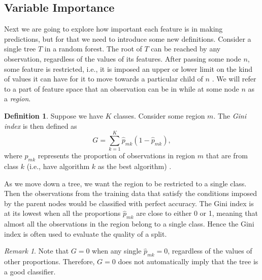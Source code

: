 \documentclass{l4proj}
\theoremstyle{definition}
\newtheorem{definition}{Definition}[chapter]
\theoremstyle{remark}
\newtheorem{remark}{Remark}[chapter]
\begin{document}
\subsection{Variable Importance}

Next we are going to explore how important each feature is in making
predictions, but for that we need to introduce some new definitions. Consider a
single tree $T$ in a random forest. The root of $T$ can be reached by any
observation, regardless of the values of its features. After passing some node
$n$, some feature is restricted, i.e., it is imposed an upper or lower limit on
the kind of values it can have for it to move towards a particular child of $n$
\cite{James:2014:ISL:2517747}. We will refer to a part of feature space that an
observation can be in while at some node $n$ as a \emph{region}.

\begin{definition}
  Suppose we have $K$ classes. Consider some region $m$. The \emph{Gini index}
  is then defined as
  \[ G = \sum_{k=1}^K \hat{p}_{mk}(1-\hat{p}_{mk}), \]
  where $\hat{p}_{mk}$ represents the proportion of observations in region $m$
  that are from class $k$ (i.e., have algorithm $k$ as the best algorithm)
  \cite{James:2014:ISL:2517747}.
\end{definition}

As we move down a tree, we want the region to be restricted to a single class.
Then the observations from the training data that satisfy the conditions imposed
by the parent nodes would be classified with perfect accuracy. The Gini index is
at its lowest when all the proportions $\hat{p}_{mk}$ are close to either 0 or
1, meaning that almost all the observations in the region belong to a single
class. Hence the Gini index is often used to evaluate the quality of a split.

\begin{remark}
  Note that $G=0$ when any single $\hat{p}_{mk}=0$, regardless of the values of
  other proportions. Therefore, $G=0$ does not automatically imply that the tree
  is a good classifier.
\end{remark}
\end{document}

